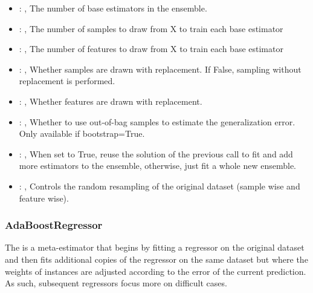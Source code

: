 \begin{itemize}
    \item {}: ,
      The number of base estimators in the ensemble.

    \item {}: ,
      The number of samples to draw from X to train each base estimator

    \item {}: ,
      The number of features to draw from X to train each base estimator

    \item {}: ,
      Whether samples are drawn with replacement. If False, sampling without
      replacement is performed.

    \item {}: ,
      Whether features are drawn with replacement.

    \item {}: ,
      Whether to use out-of-bag samples to estimate the generalization error.
      Only available if bootstrap=True.

    \item {}: ,
      When set to True, reuse the solution of the previous call to fit and add more
      estimators to the ensemble, otherwise, just fit a whole new ensemble.

    \item {}: ,
      Controls the random resampling of the original dataset (sample wise and feature wise).
  \end{itemize}


\subsubsection{AdaBoostRegressor}
  The  is a meta-estimator that begins by fitting a regressor on
  the original dataset and then fits additional copies of the regressor on the same dataset
  but where the weights of instances are adjusted according to the error of the current
  prediction. As such, subsequent regressors focus more on difficult cases.

